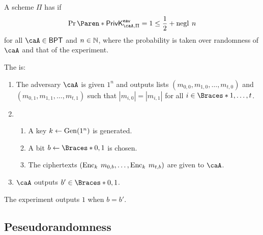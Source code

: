 \documentclass[a5paper]{article}
\begin{document}
\begin{definition*}
	A scheme $\Pi$ has  if
  \begin{equation*}
    \Pr\paren{\mathsf{PrivK}^{\mathsf{eav}}_{\caA,\Pi}=1}\leq \frac 12 + \apply{\negl}{n}
  \end{equation*}
  for all $\caA\in\mathsf{BPT}$ and $n\in\mathbb{N}$, where the probability is taken
  over randomness of $\caA$ and that of the experiment.
\end{definition*}

\begin{definition*}
  The  is:
  \begin{enumerate}%
    \itemsep0em
    \item The adversary $\caA$ is given $1^n$ and outputs lists
      $(m_{0,0},m_{1,0},\ldots,m_{t,0})$ and $(m_{0,1},m_{1,1},\ldots,m_{t,1})$
      such that $|m_{i,0}|=|m_{i,1}|$ for all $i\in\braces{1,\ldots,t}$.
    \item
      \begin{enumerate}%
        \itemsep0em
        \item A key $k\leftarrow\operatorname{Gen}(1^n)$ is generated.
        \item A bit $b\leftarrow \braces{0,1}$ is chosen.
        \item The ciphertexts $(\operatorname{Enc}_k\hspace{0.23em} m_{0,b},\ldots,\operatorname{Enc}_k\hspace{0.23em} m_{t,b})$
          are given to $\caA$.
      \end{enumerate}
    \item $\caA$ outputs $b'\in\braces{0,1}$.
  \end{enumerate}
  The experiment outputs $1$ when $b=b'$.
\end{definition*}

\subsection{Peseudorandomness}
\label{subsec:pseudorandomness}
\end{document}
